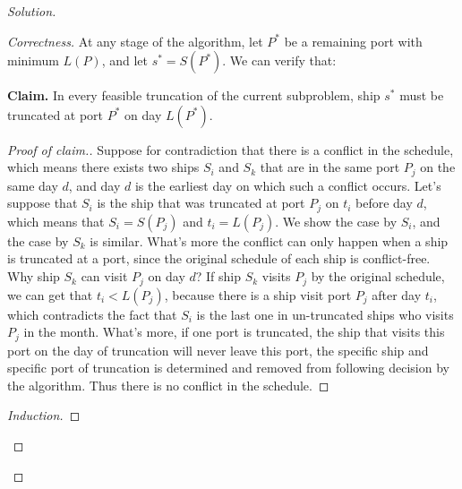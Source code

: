 \documentclass[12pt]{article}
\begin{document}
\begin{enumerate}[leftmargin=*]
\begin{proof}[Solution]


        
    \begin{proof}[Correctness]
    At any stage of the algorithm, let $P^*$ be a remaining port with minimum $L(P)$, and let $s^* = S(P^*)$.
    We can verify that:

    \medskip
    \noindent
    \textbf{Claim.} In every feasible truncation of the current subproblem, ship $s^*$ must be truncated at port $P^*$ on day $L(P^*)$.

    \medskip
    \noindent
    \begin{proof}[Proof of claim.]
        Suppose for contradiction that there is a conflict in the schedule, which means there exists two ships $S_i$ and $S_k$ that are in the same port $P_j$ on the same day $d$, and day $d$ is the earliest day on which such a conflict occurs. 
        Let's suppose that $S_i$ is the ship that was truncated at port $P_j$ on $t_i$ before day $d$, which means that $S_i = S(P_j)$ and $t_i = L(P_j)$. We show the case by $S_i$, and the case by $S_k$ is similar.
        What's more the conflict can only happen when a ship is truncated at a port, since the original schedule of each ship is conflict-free.
        Why ship $S_k$ can visit $P_j$ on day $d$? If ship $S_k$ visits $P_j$ by the original schedule, we can get that $t_i < L(P_j)$, because there is a ship visit port $P_j$ after day $t_i$, which contradicts the fact that $S_i$ is the last one in un-truncated ships who visits $P_j$ in the month.
        What's more, if one port is truncated, the ship that visits this port on the day of truncation will never leave this port, the specific ship and specific port of truncation is determined and removed from following decision by the algorithm.
        Thus there is no conflict in the schedule.
    \end{proof}
    
    \begin{proof}[Induction]
        

\end{proof}
\end{proof}
\end{proof}
\end{enumerate}
\end{document}
